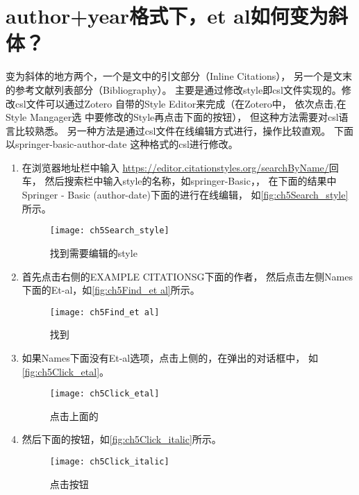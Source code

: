 \documentclass[cn,11pt,chinese]{elegantbook}
\begin{document}
						
			 	
		\section{author+year格式下，et al如何变为斜体？}\label{sec:etal_italic}
			变为斜体的地方两个，一个是文中的引文部分（Inline Citations），
			另一个是文末的参考文献列表部分（Bibliography）。
			主要是通过修改style即csl文件实现的。修改csl文件可以通过Zotero
			自带的Style Editor来完成（在Zotero中，
			依次点击,在Style Mangager选
			中要修改的Style再点击下面的按钮），
			但这种方法需要对csl语言比较熟悉。
			另一种方法是通过csl文件在线编辑方式进行，操作比较直观。
			下面以springer-basic-author-date 这种格式的csl进行修改。	
			\begin{enumerate}
				\item 
				在浏览器地址栏中输入
				\href{https://editor.citationstyles.org/searchByName/}
				{https://editor.citationstyles.org/searchByName/}回车，
				然后搜索栏中输入style的名称，如springer-Basic，，
				在下面的结果中Springer - Basic (author-date)下面的进行在线编辑，
				如\autoref{fig:ch5Search_style}所示。
				\begin{figure}[htbp]
					\centering
					\texttt{[image: ch5Search\_style]}
					\caption{找到需要编辑的style}
					\label{fig:ch5Search_style}
				\end{figure}
			\item 首先点击右侧的EXAMPLE CITATIONSG下面的作者，
			然后点击左侧Names下面的Et-al，如\autoref{fig:ch5Find_et al}所示。
				\begin{figure}[htbp]
					\centering
					\texttt{[image: ch5Find\_et al]}
					\caption{找到}
					\label{fig:ch5Find_et al}
				\end{figure}
			\item 如果Names下面没有Et-al选项，点击上侧的\menu{+}，在弹出的对话框中，
			如\autoref{fig:ch5Click_etal}。
				\begin{figure}[htbp]
					\centering
					\texttt{[image: ch5Click\_etal]}
					\caption{点击上面的\menu{+}}
					\label{fig:ch5Click_etal}
				\end{figure}
			\item 然后下面的按钮，如\autoref{fig:ch5Click_italic}所示。
				\begin{figure}[htbp]
					\centering
					\texttt{[image: ch5Click\_italic]}
					\caption{点击按钮}
					\label{fig:ch5Click_italic}
				\end{figure}
			\end{enumerate}
\end{document}
